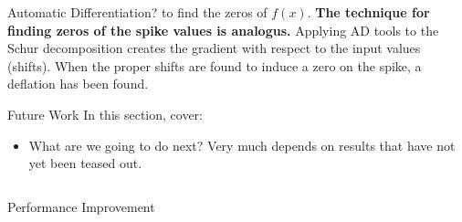 \documentclass[final]{beamer}
\newlength{\onecolwid}
\newlength{\twocolwid}
\begin{document}
\begin{frame}[t]
\begin{columns}[t]
\begin{column}{\twocolwid}
\begin{columns}[t,totalwidth=\twocolwid]
\begin{column}{\onecolwid}
\begin{block}{Automatic Differentiation?}
to find the zeros of $f(x)$. \textbf{The technique for finding zeros of the
spike values is analogus.} Applying AD tools to the Schur decomposition creates
the gradient with respect to the input values (shifts). When the proper shifts
are found to induce a zero on the spike, a deflation has been found.
\end{block}


\begin{block}{Future Work}
In this section, cover:
\begin{itemize}
\item What are we going to do next? Very much depends on results that have not
yet been teased out.
\end{itemize}
\end{block}


\end{column} %

\end{columns} %


%
%
%
%
%
%


\begin{alertblock}{Performance Improvement}


\end{alertblock}
\end{column}
\end{columns}
\end{frame}
\end{document}

